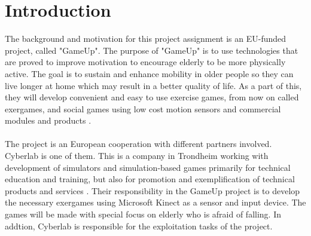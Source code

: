 \chapter{Introduction}
The background and motivation for this project assignment is an EU-funded project, called "GameUp". The purpose of "GameUp" is to use technologies that are proved to improve motivation to encourage elderly to be more physically active. The goal is to sustain and enhance mobility in older people so they can live longer at home which may result in a better quality of life. As a part of this, they will develop convenient and easy to use exercise games, from now on called exergames, and social games using low cost motion sensors and commercial modules and products \cite{gameup}.\\ \\ The project is an European cooperation with different partners involved. Cyberlab is one of them. This is a company in Trondheim working with development of simulators and simulation-based games primarily for technical education and training, but also for promotion and exemplification of technical products and services \cite{cyberlab}. Their responsibility in the GameUp project is to develop the necessary exergames using Microsoft Kinect as a sensor and input device. The games will be made with special focus on elderly who is afraid of falling. In addtion, Cyberlab is responsible for the exploitation tasks of the project.  \\ \\

